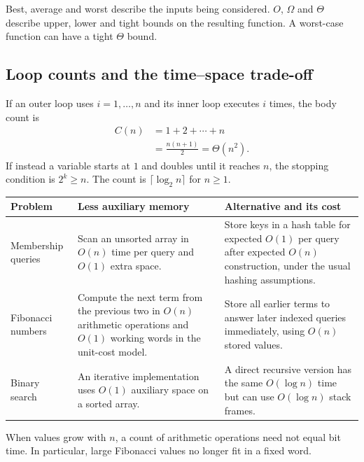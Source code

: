 \documentclass[12pt,a4paper]{article}
\begin{document}
\begin{tcolorbox}[masonbox, title={Common exam distinction}]
Best, average and worst describe the inputs being considered. $O$, $\Omega$ and $\Theta$ describe upper, lower and tight bounds on the resulting function. A worst-case function can have a tight $\Theta$ bound.
\end{tcolorbox}

\subsection{Loop counts and the time--space trade-off}
\begin{tcolorbox}[examplebox, title={Counting triangular loops}]
If an outer loop uses $i=1,\dots,n$ and its inner loop executes $i$ times, the body count is
\begin{align*}
C(n)&=1+2+\cdots+n\\
    &=\frac{n(n+1)}{2}
    =\Theta(n^2).
\end{align*}
If instead a variable starts at $1$ and doubles until it reaches $n$, the stopping condition is $2^k\ge n$. The count is $\lceil\log_2 n\rceil$ for $n\ge1$.
\end{tcolorbox}

\par\vspace{5pt}
\begingroup
\setlength{\extrarowheight}{1pt}
\noindent\begin{tabularx}{\linewidth}{|B{3.1cm}|Y|Y|}
\hline
\textbf{Problem} & \textbf{Less auxiliary memory} & \textbf{Alternative and its cost} \\ \hline
Membership queries & Scan an unsorted array in $O(n)$ time per query and $O(1)$ extra space. & Store keys in a hash table for expected $O(1)$ per query after expected $O(n)$ construction, under the usual hashing assumptions. \\ \hline
Fibonacci numbers & Compute the next term from the previous two in $O(n)$ arithmetic operations and $O(1)$ working words in the unit-cost model. & Store all earlier terms to answer later indexed queries immediately, using $O(n)$ stored values. \\ \hline
Binary search & An iterative implementation uses $O(1)$ auxiliary space on a sorted array. & A direct recursive version has the same $O(\log n)$ time but can use $O(\log n)$ stack frames. \\ \hline
\end{tabularx}\par
\endgroup
When values grow with $n$, a count of arithmetic operations need not equal bit time. In particular, large Fibonacci values no longer fit in a fixed word.
\end{document}
